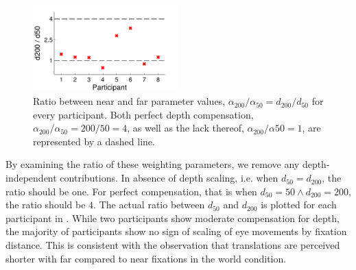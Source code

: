 \begin{figure}
    \includegraphics[width=0.5\textwidth]{src/paper4/p4_figure5.pdf}

	\caption{Ratio between near and far parameter values, $\alpha_{200} / \alpha_{50} = d_{200} / d_{50}$ for every participant. Both perfect depth compensation, $\alpha_{200} / \alpha_{50} = 200 / 50 = 4$, as well as the lack thereof, $\alpha_{200} / \alpha{50} = 1$, are represented by a dashed line.}
	\label{p4:fig5}
\end{figure}

By examining the ratio of these weighting parameters, we remove any depth-independent contributions. In absence of  depth scaling, i.e. when $d_{50} = d_{200}$, the ratio should be one. For perfect compensation, that is when $d_{50} = 50  \wedge d_{200} = 200$, the ratio should be $4$. The actual ratio between $d_{50}$ and $d_{200}$ is plotted for each participant in . While two participants show moderate compensation for depth, the majority of participants show no sign of scaling of eye movements by fixation distance. This is consistent with the observation that translations are perceived shorter with far compared to near fixations in the world condition.
